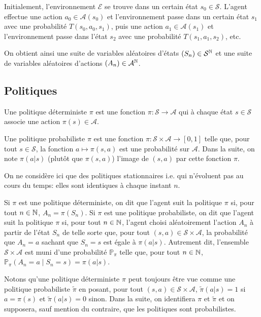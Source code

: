 \bigskip

Initialement, l'environnement $\mathcal{E}$ se trouve dans un certain état $s_0\in\mathcal{S}$. L'agent effectue une action $a_0\in\mathcal{A}(s_0)$ et l'environnement passe dans un certain état $s_1$ avec une probabilité $T(s_0, a_0, s_1)$, puis une action $a_1\in\mathcal{A}(s_1)$ et l'environnement passe dans l'état $s_2$ avec une probabilité $T(s_1,a_1,s_2)$, etc. 

On obtient ainsi une suite de variables aléatoires d'états $(S_n)\in \mathcal{S}^{\mathbb{N}}$ et une suite de variables aléatoires d'actions $(A_n)\in\mathcal{A}^{\mathbb{N}}$. 

\subsection{Politiques}

Une politique déterministe $\pi$ est une fonction $\pi:\mathcal{S} \to \mathcal{A}$ qui à chaque état $s\in\mathcal{S}$ associe une action $\pi(s)\in\mathcal{A}$.

Une politique probabiliste $\pi$ est une fonction $\pi:\mathcal{S} \times \mathcal{A} \to [0,1]$ telle que, pour tout $s\in\mathcal{S}$, la fonction $a \mapsto \pi(s,a)$ est une probabilité sur $\mathcal{A}$. Dans la suite, on note $\pi(a|s)$ (plutôt que $\pi(s,a)$) l'image de $(s,a)$ par cette fonction $\pi$. 

On ne considère ici que des politiques stationnaires i.e. qui n'évoluent pas au cours du temps: elles sont identiques à chaque instant $n$. 

\bigskip

Si $\pi$ est une politique déterministe, on dit que l'agent suit la politique $\pi$ si, pour tout $n\in\mathbb{N}$, $A_{n}=\pi(S_n)$. Si $\pi$ est une politique probabiliste, on dit que l'agent suit la politique $\pi$ si, pour tout $n\in\mathbb{N}$, l'agent choisi aléatoirement l'action $A_n$ à partir de l'état $S_n$ de telle sorte que, pour tout $(s,a)\in\mathcal{S}\times\mathcal{A}$, la probabilité que $A_{n}=a$ sachant que $S_{n}=s$ est égale à $\pi(a|s)$. Autrement dit, l'ensemble $\mathcal{S}\times \mathcal{A}$ est muni d'une probabilité $\mathbb{P}_{\pi}$ telle que, pour tout $n\in\mathbb{N}$, $\mathbb{P}_{\pi}(A_n=a \mid S_n=s)=\pi(a|s)$. 

Notons qu'une politique déterministe $\pi$ peut toujours être vue comme une politique probabiliste $\tilde{\pi}$ en posant, pour tout $(s,a)\in \mathcal{S}\times\mathcal{A}$, $\tilde{\pi}(a|s)=1$ si $a=\pi(s)$ et $\tilde{\pi}(a|s)=0$ sinon. Dans la suite, on identifiera $\pi$ et $\tilde{\pi}$ et on supposera, sauf mention du contraire, que les politiques sont probabilistes.

